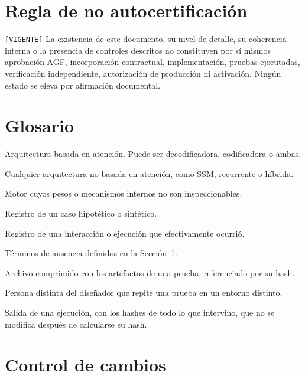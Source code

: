 \documentclass[12pt]{article}
\begin{document}
\section{Regla de no autocertificación}

\texttt{[VIGENTE]} La existencia de este documento, su nivel de detalle, su
coherencia interna o la presencia de controles descritos no constituyen por
sí mismos aprobación AGF, incorporación contractual, implementación, pruebas
ejecutadas, verificación independiente, autorización de producción ni
activación. Ningún estado se eleva por afirmación documental.

\section{Glosario}

\begin{description}[leftmargin=4.2cm, style=nextline]
    \item[Transformer] Arquitectura basada en atención. Puede ser decodificadora, codificadora o ambas.
    \item[No transformer] Cualquier arquitectura no basada en atención, como SSM, recurrente o híbrida.
    \item[Motor opaco] Motor cuyos pesos o mecanismos internos no son inspeccionables.
    \item[SIMULACION] Registro de un caso hipotético o sintético.
    \item[REAL] Registro de una interacción o ejecución que efectivamente ocurrió.
    \item[NO\_VERIFICABLE, NO\_DISPONIBLE, NO\_APLICABLE] Términos de ausencia definidos en la Sección~1.
    \item[Paquete] Archivo comprimido con los artefactos de una prueba, referenciado por su hash.
    \item[Validador] Persona distinta del diseñador que repite una prueba en un entorno distinto.
    \item[Registro] Salida de una ejecución, con los hashes de todo lo que intervino, que no se modifica después de calcularse su hash.
\end{description}

\section*{Control de cambios}
\end{document}
